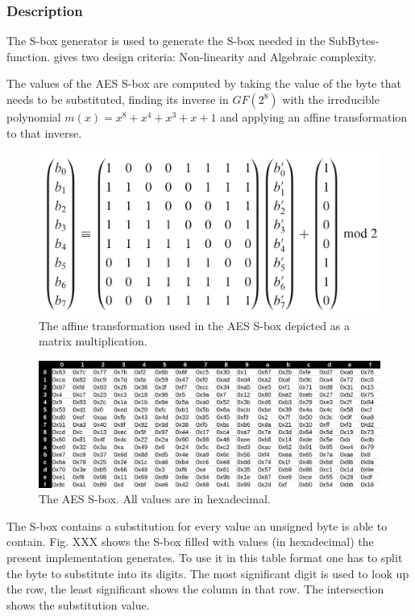 \hypertarget{description-1}{%
\subsubsection{Description}\label{description-1}}

The S-box generator is used to generate the S-box needed in the
SubBytes-function. \cite[ch 3.4.1]{rijndael} gives two design criteria: Non-linearity
and Algebraic complexity.

The values of the AES S-box are computed by taking the value of the byte
that needs to be substituted, finding its inverse in $GF(2^{8})$ with the
irreducible polynomial $m(x) = x^8 + x^4 + x^3 + x + 1$ and applying an
affine transformation to that inverse.

\begin{figure}
\centering
\includegraphics[scale = 0.4]{data/figures/affinetrans.png} 
\caption{The affine transformation used in the AES S-box depicted as a matrix multiplication.}
\end{figure}

\begin{figure}
\centering
\includegraphics[scale = 0.4]{data/figures/S-box.png} 
\caption{The AES S-box. All values are in hexadecimal.}
\end{figure}


The S-box contains a substitution for every value an unsigned byte is
able to contain. Fig. XXX shows the S-box filled with values (in
hexadecimal) the present implementation generates. To use it in this
table format one has to split the byte to substitute into its digits.
The most significant digit is used to look up the row, the least
significant shows the column in that row. The intersection shows the
substitution value.

